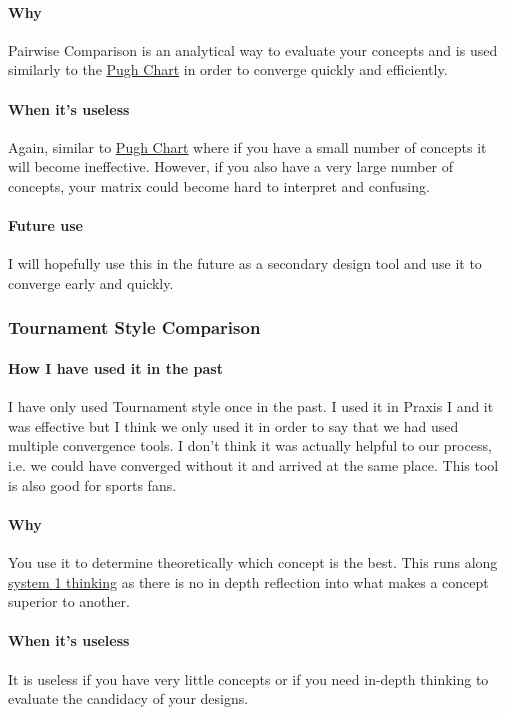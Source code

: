 \documentclass[paper=a4, fontsize=11pt]{article} %
\newcommand{\raisetarget}[2]%
{\bgroup
  \sbox0{#2}%
  \raisebox{\ht0}{\hypertarget{#1}{}}\usebox0%
\egroup}
\begin{document}
            \paragraph{Why}
            Pairwise Comparison is an analytical way to evaluate your concepts and is used similarly to the \hyperlink{pughlink}{Pugh Chart} in order to converge quickly and efficiently. 
            \paragraph{When it's useless}
            Again, similar to \hyperlink{pughlink}{Pugh Chart} where if you have a small number of concepts it will become ineffective. However, if you also have a very large number of concepts, your matrix could become hard to interpret and confusing.
            \paragraph{Future use}
            I will hopefully use this in the future as a secondary design tool and use it to converge early and quickly.
        \raisetarget{tourlink}{}
        \subsubsection{Tournament Style Comparison}
            \paragraph{How I have used it in the past}
            \cite{tournament} I have only used Tournament style once in the past. I used it in Praxis I and it was effective but I think we only used it in order to say that we had used multiple convergence tools. I don't think it was actually helpful to our process, i.e. we could have converged without it and arrived at the same place. This tool is also good for sports fans.
            \paragraph{Why}
            You use it to determine theoretically which concept is the best. This runs along \hyperlink{sys1v2}{system 1 thinking} as there is no in depth reflection into what makes a concept superior to another.
            \paragraph{When it's useless}
            It is useless if you have very little concepts or if you need in-depth thinking to evaluate the candidacy of your designs.
\end{document}
